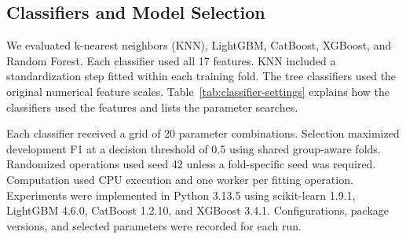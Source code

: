 \documentclass[conference]{IEEEtran}
\begin{document}
\subsection{Classifiers and Model Selection}

We evaluated k-nearest neighbors (KNN), LightGBM, CatBoost,
XGBoost, and Random Forest. Each classifier used all 17 features.
KNN included a standardization step fitted within each training
fold. The tree classifiers used the original numerical feature
scales. Table~\ref{tab:classifier-settings} explains how the
classifiers used the features and lists the parameter searches.

Each classifier received a grid of 20 parameter combinations.
Selection maximized development F1 at a decision threshold of
0.5 using shared group-aware folds. Randomized operations used
seed 42 unless a fold-specific seed was required. Computation
used CPU execution and one worker per fitting operation.
Experiments were implemented in Python 3.13.5 using
scikit-learn 1.9.1, LightGBM 4.6.0, CatBoost 1.2.10,
and XGBoost 3.4.1. Configurations, package versions, and
selected parameters were recorded for each run.
\end{document}
